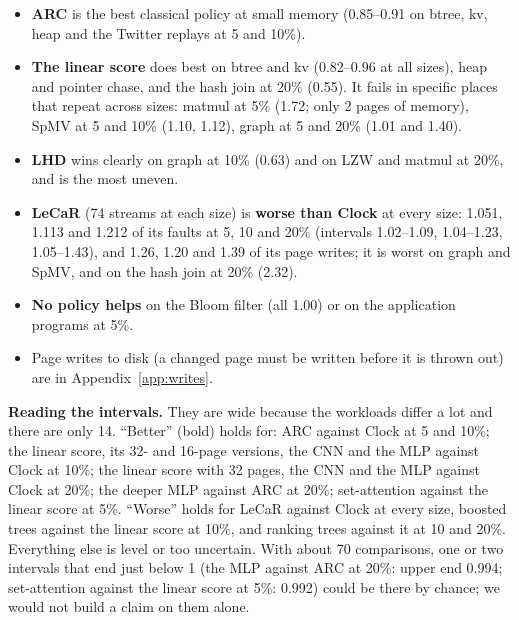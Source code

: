 \documentclass[10.5pt,a4paper]{article}
\begin{document}
\begin{itemize}
\item \textbf{ARC} is the best classical policy at small memory (0.85--0.91 on btree, kv, heap and the Twitter replays at 5 and 10\%).
\item \textbf{The linear score} does best on btree and kv (0.82--0.96 at all sizes), heap and pointer chase, and the hash join at 20\% (0.55).
  It fails in specific places that repeat across sizes: matmul at 5\% (1.72; only 2 pages of memory), SpMV at 5 and 10\% (1.10, 1.12), graph at 5 and 20\% (1.01 and 1.40).
\item \textbf{LHD} wins clearly on graph at 10\% (0.63) and on LZW and matmul at 20\%, and is the most uneven.
\item \textbf{LeCaR} (74 streams at each size) is \textbf{worse than Clock} at every size: 1.051, 1.113 and 1.212 of its faults at 5, 10 and 20\% (intervals 1.02--1.09, 1.04--1.23, 1.05--1.43), and 1.26, 1.20 and 1.39 of its page writes; it is worst on graph and SpMV, and on the hash join at 20\% (2.32).
\item \textbf{No policy helps} on the Bloom filter (all 1.00) or on the application programs at 5\%.
\item Page writes to disk (a changed page must be written before it is thrown out) are in Appendix~\ref{app:writes}.
\end{itemize}

\begin{table}[h]
\centering\footnotesize

\caption{The main comparisons, with 95\% intervals. Bold: the whole interval is below 1. At 10\% memory every row uses all 74 streams. Every row uses all 74 streams, at every memory size where it was run; the 16-page score was run at 10\% only.}
\label{tab:ci}
\end{table}

\textbf{Reading the intervals.} They are wide because the workloads differ a lot and there are only 14. ``Better'' (bold) holds for: ARC against Clock at 5 and 10\%; the linear score, its 32- and 16-page
versions, the CNN and the MLP against Clock at 10\%; the linear score with 32 pages, the CNN and the MLP against Clock at 20\%; the deeper MLP against ARC at 20\%; set-attention against the linear score at 5\%. ``Worse'' holds for LeCaR against Clock at every size, boosted trees against the linear score at 10\%, and ranking trees against it at 10 and 20\%.
Everything else is level or too uncertain. With about 70 comparisons, one or two intervals that end just below 1 (the MLP against ARC at 20\%: upper end 0.994; set-attention against the linear score at 5\%: 0.992) could be there by chance; we would not build a claim on them alone.
\end{document}
